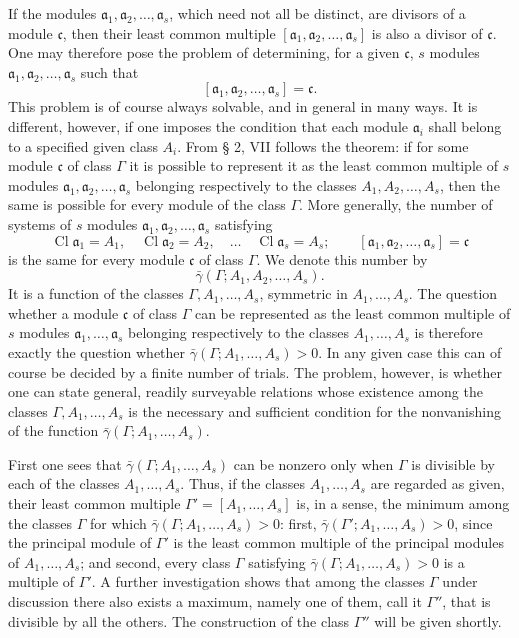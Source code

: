 \documentclass[11pt,a4paper]{article}
\newcommand{\Cl}{\operatorname{Cl}}
\begin{document}
If the modules $\mathfrak a_1,\mathfrak a_2,\ldots,\mathfrak a_s$, which need not all be distinct, are divisors of a module $\mathfrak c$, then their least common multiple $[\mathfrak a_1,\mathfrak a_2,\ldots,\mathfrak a_s]$ is also a divisor of $\mathfrak c$. One may therefore pose the problem of determining, for a given $\mathfrak c$, $s$ modules $\mathfrak a_1,\mathfrak a_2,\ldots,\mathfrak a_s$ such that
\[
 [\mathfrak a_1,\mathfrak a_2,\ldots,\mathfrak a_s]=\mathfrak c.
\]
This problem is of course always solvable, and in general in many ways. It is different, however, if one imposes the condition that each module $\mathfrak a_i$ shall belong to a specified given class $A_i$. From § 2, VII follows the theorem: if for some module $\mathfrak c$ of class $\Gamma$ it is possible to represent it as the least common multiple of $s$ modules $\mathfrak a_1,\mathfrak a_2,\ldots,\mathfrak a_s$ belonging respectively to the classes $A_1,A_2,\ldots,A_s$, then the same is possible for every module of the class $\Gamma$. More generally, the number of systems of $s$ modules $\mathfrak a_1,\mathfrak a_2,\ldots,\mathfrak a_s$ satisfying
\[
 \Cl\mathfrak a_1=A_1,
 \quad
 \Cl\mathfrak a_2=A_2,
 \quad\ldots\quad
 \Cl\mathfrak a_s=A_s;
 \qquad
 [\mathfrak a_1,\mathfrak a_2,\ldots,\mathfrak a_s]=\mathfrak c
\]
is the same for every module $\mathfrak c$ of class $\Gamma$. We denote this number by
\[
 \bar\gamma(\Gamma;A_1,A_2,\ldots,A_s).
\]
It is a function of the classes $\Gamma,A_1,\ldots,A_s$, symmetric in $A_1,\ldots,A_s$. The question whether a module $\mathfrak c$ of class $\Gamma$ can be represented as the least common multiple of $s$ modules $\mathfrak a_1,\ldots,\mathfrak a_s$ belonging respectively to the classes $A_1,\ldots,A_s$ is therefore exactly the question whether $\bar\gamma(\Gamma;A_1,\ldots,A_s)>0$. In any given case this can of course be decided by a finite number of trials. The problem, however, is whether one can state general, readily surveyable relations whose existence among the classes $\Gamma,A_1,\ldots,A_s$ is the necessary and sufficient condition for the nonvanishing of the function $\bar\gamma(\Gamma;A_1,\ldots,A_s)$.

First one sees that $\bar\gamma(\Gamma;A_1,\ldots,A_s)$ can be nonzero only when $\Gamma$ is divisible by each of the classes $A_1,\ldots,A_s$. Thus, if the classes $A_1,\ldots,A_s$ are regarded as given, their least common multiple $\Gamma'=[A_1,\ldots,A_s]$ is, in a sense, the minimum among the classes $\Gamma$ for which $\bar\gamma(\Gamma;A_1,\ldots,A_s)>0$: first, $\bar\gamma(\Gamma';A_1,\ldots,A_s)>0$, since the principal module of $\Gamma'$ is the least common multiple of the principal modules of $A_1,\ldots,A_s$; and second, every class $\Gamma$ satisfying $\bar\gamma(\Gamma;A_1,\ldots,A_s)>0$ is a multiple of $\Gamma'$. A further investigation shows that among the classes $\Gamma$ under discussion there also exists a maximum, namely one of them, call it $\Gamma''$, that is divisible by all the others. The construction of the class $\Gamma''$ will be given shortly.
\end{document}
